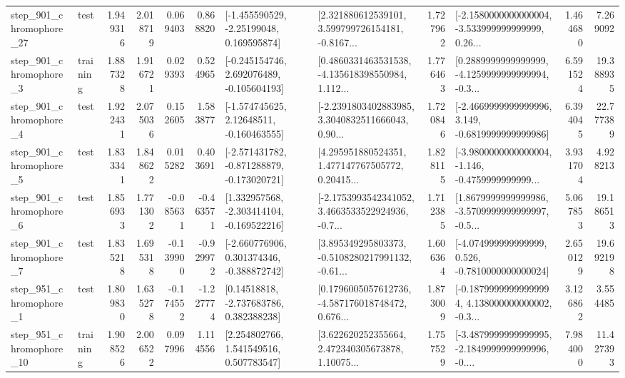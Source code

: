 \begin{tabular}{llrrrrllrlrr}
  step\_901\_chromophore\_27 &      test &      1.949316 &    2.018719 &      0.069403 &  0.868820 &    [-1.455590529, -2.25199048, 0.169595874] &  [2.321880612539101, 3.599799726154181, -0.8167... &       1.727962 &  [-2.1580000000000004, -3.533999999999999, 0.26... &            1.464680 &          7.269092 \\
   step\_901\_chromophore\_3 &  training &      1.887328 &    1.916721 &      0.029393 &  0.524965 &   [-0.245154746, 2.692076489, -0.105604193] &  [0.4860331463531538, -4.135618398550984, 1.112... &       1.776463 &  [0.2889999999999999, -4.1259999999999994, -0.3... &            6.591524 &         19.388935 \\
   step\_901\_chromophore\_4 &      test &      1.922431 &    2.075036 &      0.152605 &  1.583877 &    [-1.574745625, 2.12648511, -0.160463555] &  [-2.2391803402883985, 3.3040832511666043, 0.90... &       1.720846 &  [-2.4669999999999996, 3.149, -0.6819999999999986] &            6.394045 &         22.777389 \\
   step\_901\_chromophore\_5 &      test &      1.833341 &    1.848622 &      0.015282 &  0.403691 &  [-2.571431782, -0.871288879, -0.173020721] &  [4.295951880524351, 1.477147767505772, 0.20415... &       1.828115 &  [-3.9800000000000004, -1.146, -0.4759999999999... &            3.931704 &          4.928213 \\
   step\_901\_chromophore\_6 &      test &      1.856933 &    1.771302 &     -0.085631 & -0.463571 &   [1.332957568, -2.303414104, -0.169522216] &  [-2.1753993542341052, 3.4663533522924936, -0.7... &       1.712385 &  [1.8679999999999986, -3.5709999999999997, -0.5... &            5.067853 &         19.186513 \\
   step\_901\_chromophore\_7 &      test &      1.835218 &    1.695318 &     -0.139900 & -0.929972 &   [-2.660776906, 0.301374346, -0.388872742] &  [3.895349295803373, -0.5108280217991132, -0.61... &       1.606364 &   [-4.074999999999999, 0.526, -0.7810000000000024] &            2.650129 &         19.692198 \\
   step\_951\_chromophore\_1 &      test &      1.809830 &    1.635278 &     -0.174552 & -1.227774 &     [0.14518818, -2.737683786, 0.382388238] &  [0.1796005057612736, -4.587176018748472, 0.676... &       1.873009 &  [-0.18799999999999994, 4.138000000000002, -0.3... &            3.126862 &          3.554485 \\
  step\_951\_chromophore\_10 &  training &      1.908526 &    2.006522 &      0.097996 &  1.114556 &     [2.254802766, 1.541549516, 0.507783547] &  [3.622620252355664, 2.472340305673878, 1.10075... &       1.757529 &  [-3.4879999999999995, -2.1849999999999996, -0.... &            7.984000 &         11.427393 \\

\end{tabular}
